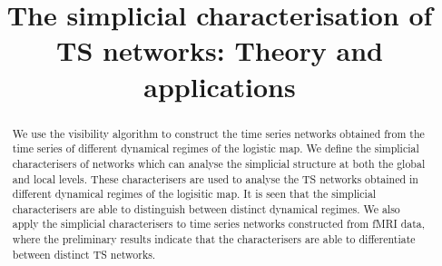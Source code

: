 \documentclass[aps,pre,superscriptaddress,groupedaddress,preprint]{revtex4}  %
\begin{document}
\title{The simplicial characterisation of TS networks: Theory and applications}




\begin{abstract}
We use the visibility algorithm to construct the time series networks obtained from the time series of different dynamical regimes of the logistic map. We define the simplicial characterisers of networks which can analyse the simplicial structure at both the global and local levels. These characterisers are used to analyse the TS networks obtained in different dynamical regimes of the logisitic map. It is seen that the simplicial characterisers are able to distinguish between distinct dynamical regimes. We also apply the simplicial characterisers to time series networks constructed from fMRI data, where the preliminary results indicate that the characterisers are able to differentiate between distinct TS networks.
\end{abstract}


\maketitle

\end{document}
